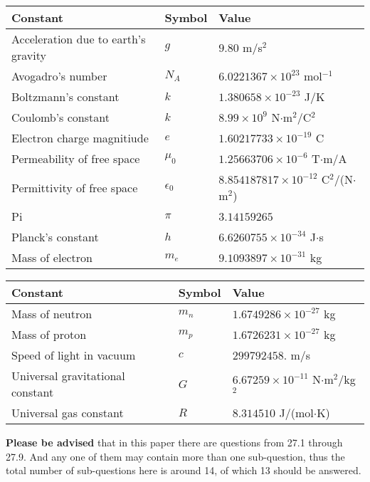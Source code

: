 \documentclass[12pt]{article}
\begin{document}
 
 
\noindent\begin{tabular}{|l|l|l|}
\hline
Constant & Symbol & Value \\
\hline
Acceleration due to earth's gravity &
$g$ &
 $ 9.80 $
m/s$^2$ \\
\hline
Avogadro's number &
$N_A$ &
 $ 6.0221367 \times 10^{23} $
mol$^{-1}$ \\
\hline
Boltzmann's constant &
$k$ &
 $ 1.380658 \times 10^{-23} $
J/K \\
\hline
Coulomb's constant &
$k$ &
 $ 8.99 \times 10^{9} $
N$\cdot $m$^2$/C$^2$ \\
\hline
Electron charge magnitiude &
$e$ &
 $ 1.60217733 \times 10^{-19} $
C \\
\hline
Permeability of free space &
$\mu _0$ &
 $ 1.25663706 \times 10^{-6} $
T$\cdot $m/A \\
\hline
Permittivity of free space &
$\epsilon _0$ &
 $ 8.854187817 \times 10^{-12} $
C$^2$/(N$\cdot $m$^2$) \\
\hline
Pi &
$\pi$ &
 $ 3.14159265 $
$ $ \\
\hline
Planck's constant &
$h$ &
 $ 6.6260755 \times 10^{-34} $
J$\cdot $s \\
\hline
Mass of electron &
$m_e$ &
 $ 9.1093897 \times 10^{-31} $
kg \\
\hline
\end{tabular}
 
 
\noindent\begin{tabular}{|l|l|l|}
\hline
Constant & Symbol & Value \\
\hline
Mass of neutron &
$m_n$ &
 $ 1.6749286 \times 10^{-27} $
kg \\
\hline
Mass of proton &
$m_p$ &
 $ 1.6726231 \times 10^{-27} $
kg \\
\hline
Speed of light in vacuum &
$c$ &
 $ 299792458. $
m/s \\
\hline
Universal gravitational constant &
$G$ &
 $ 6.67259 \times 10^{-11} $
N$\cdot $m$^2$/kg$^2$ \\
\hline
Universal gas constant &
$R$ &
 $ 8.314510 $
J/(mol$\cdot $K) \\
\hline
\end{tabular}
 
 
{\textbf{\large{Please be advised}}} that in this paper there are questions from
27.1 through
27.9.
And any one of them may contain more than one sub-question, thus the total number
of sub-questions here is around 14, of which
13 should be answered.
 
\end{document}
